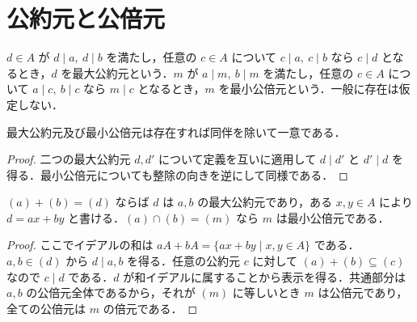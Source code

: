 \section{公約元と公倍元}
\begin{defn}[最大公約元と最小公倍元]
$d\in A$ が $d\mid a,\ d\mid b$ を満たし，任意の $c\in A$ について $c\mid a,\ c\mid b$ なら $c\mid d$ となるとき，$d$ を最大公約元という．$m$ が $a\mid m,\ b\mid m$ を満たし，任意の $c\in A$ について $a\mid c,\ b\mid c$ なら $m\mid c$ となるとき，$m$ を最小公倍元という．一般に存在は仮定しない．
\end{defn}
\begin{prop}
最大公約元及び最小公倍元は存在すれば同伴を除いて一意である．
\end{prop}
\begin{proof}
二つの最大公約元 $d,d'$ について定義を互いに適用して $d\mid d'$ と $d'\mid d$ を得る．最小公倍元についても整除の向きを逆にして同様である．
\end{proof}
\begin{prop}
$(a)+(b)=(d)$ ならば $d$ は $a,b$ の最大公約元であり，ある $x,y\in A$ により $d=ax+by$ と書ける．$(a)\cap(b)=(m)$ なら $m$ は最小公倍元である．
\end{prop}
\begin{proof}
ここでイデアルの和は $aA+bA=\{ax+by\mid x,y\in A\}$ である．$a,b\in(d)$ から $d\mid a,b$ を得る．任意の公約元 $c$ に対して $(a)+(b)\subseteq(c)$ なので $c\mid d$ である．$d$ が和イデアルに属することから表示を得る．共通部分は $a,b$ の公倍元全体であるから，それが $(m)$ に等しいとき $m$ は公倍元であり，全ての公倍元は $m$ の倍元である．
\end{proof}
